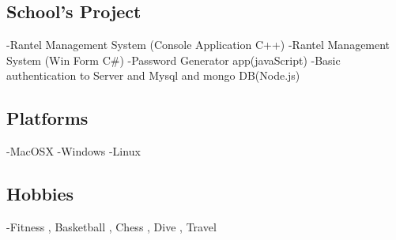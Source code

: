 \documentclass[letterpaper]{twentysecondcv} %
\begin{document}
\subsection{School's Project}
-Rantel Management System (Console Application C++)\newline
-Rantel Management System (Win Form C\#)\newline
-Password Generator app(javaScript)\newline
-Basic authentication to Server and Mysql and mongo DB(Node.js)\newline

\subsection{Platforms} 
-MacOSX\newline
-Windows\newline
-Linux\newline
\subsection{Hobbies}
-Fitness , Basketball , Chess , Dive , Travel








\end{document}
